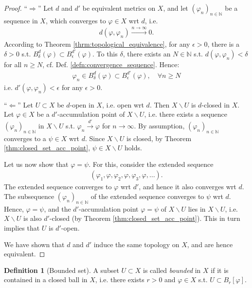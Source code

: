 \documentclass[12pt, a4paper]{article}
\numberwithin{equation}{section}
\theoremstyle{definition}
\theoremstyle{definition}
\newtheorem{defn}[thm]{Definition} %
\begin{document}
	\begin{proof}
		\enquote{$\Longrightarrow$} Let $d$ and $d'$ be equivalent metrics on $X$, and let $(\varphi_n)_{n\in\mathbb N}$ be a sequence in $X$, which converges to $\varphi\in X$ wrt $d$, i.e.
		\begin{align}
			d(\varphi, \varphi_n) \overset{n\to\infty}{\longrightarrow} 0.
		\end{align}
		According to Theorem \ref{thrm:topological_equivalence}, for any $\epsilon > 0$, there is a $\delta > 0$ s.t. $B_{\delta}^{d}(\varphi) \subset B_{\epsilon}^{d'}(\varphi)$. To this $\delta$, there exists an $N\in\mathbb N$ s.t. $d(\varphi, \varphi_n) < \delta$ for all $n\geq N$, cf. Def. \ref{defn:convergence_sequence}. Hence:
		\begin{align}
			\varphi_n\in B^{d}_{\delta}(\varphi) \subset B^{d'}_{\epsilon}(\varphi), \quad \forall n\geq N
		\end{align}
		i.e. $d'(\varphi, \varphi_n) < \epsilon$ for any $\epsilon > 0$.
		
		\enquote{$\Longleftarrow$} Let $U\subset X$ be $d$-open in $X$, i.e. open wrt $d$. Then $X\backslash U$ is $d$-closed in $X$. Let $\varphi\in X$ be a $d'$-accumulation point of $X\backslash U$, i.e. there exists a sequence $(\varphi_n)_{n\in\mathbb N}$ in $X\backslash U$ s.t. $\varphi_n \overset{d'}{\longrightarrow} \varphi$ for $n\to\infty$. By assumption, $(\varphi_n)_{n\in\mathbb N}$ converges to a $\psi\in X$ wrt $d$. Since $X\backslash U$ is closed, by Theorem \ref{thm:closed_set_acc_point}, $\psi\in X\backslash U$ holds. 
		
		Let us now show that $\varphi = \psi$. For this, consider the extended sequence 
		\begin{align}
			\left(\varphi_1, \varphi, \varphi_2, \varphi, \varphi_3, \varphi, \dots\right).
		\end{align}
		The extended sequence converges to $\varphi$ wrt $d'$, and hence it also converges wrt $d$. The subsequence $(\varphi_n)_{n\in\mathbb N}$ of the extended sequence converges to $\psi$ wrt $d$. Hence, $\varphi = \psi$, and the $d'$-accumulation point $\varphi=\psi$ of $X\backslash U$ lies in $X\backslash U$, i.e. $X\backslash U$ is also $d'$-closed (by Theorem \ref{thm:closed_set_acc_point}). This in turn implies that $U$ is $d'$-open.
		
		We have shown that $d$ and $d'$ induce the same topology on $X$, and are hence equivalent.
	\end{proof}

	\begin{defn}[Bounded set]
		A subset $U\subset X$ is called \textit{bounded} in $X$ if it is contained in a closed ball in $X$, i.e. there exists $r > 0$ and $\varphi \in X$ s.t. $U\subset B_{r}[\varphi]$.
	\end{defn}
\end{document}
